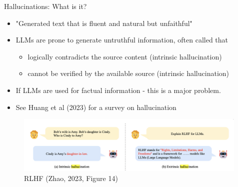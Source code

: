 \documentclass[10pt]{beamer}
\begin{document}
\begin{frame}{Hallucinations: What is it?}
\begin{itemize}
\item "Generated text that is fluent and natural but unfaithful"
\item LLMs are prone to generate untruthful information, often called  that
\begin{itemize}
\item logically contradicts the source content (intrinsic hallucination)
\item cannot be verified by the available source (intrinsic hallucination)
\end{itemize}
\item If LLMs are used for factual information - this is a major problem.
\item See Huang et al (2023) for a survey on hallucination %
\end{itemize}

\begin{figure}[h]
\centering
\includegraphics[width=0.99\textwidth]{fig/zhou_2023_fig14}
\caption{RLHF (Zhao, 2023, Figure 14)}
\end{figure}

\end{frame}




\end{document}
